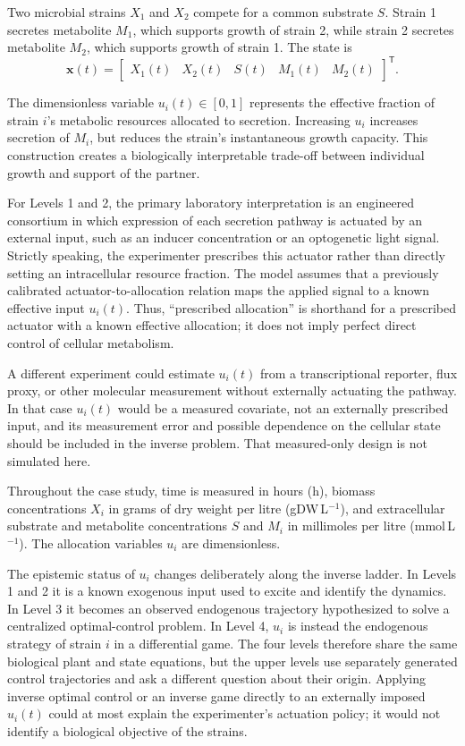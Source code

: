 \documentclass[11pt,a4paper]{article}
\newcommand{\vect}[1]{\boldsymbol{#1}}
\begin{document}
Two microbial strains \(X_1\) and \(X_2\) compete for a common substrate \(S\).
Strain 1 secretes metabolite \(M_1\), which supports growth of strain 2, while
strain 2 secretes metabolite \(M_2\), which supports growth of strain 1. The
state is
\begin{equation}
  \vect{x}(t)=
  \begin{bmatrix}
    X_1(t) & X_2(t) & S(t) & M_1(t) & M_2(t)
  \end{bmatrix}^{\mathsf T}.
\end{equation}

The dimensionless variable \(u_i(t)\in[0,1]\) represents the effective
fraction of strain \(i\)'s metabolic resources allocated to secretion.
Increasing \(u_i\) increases secretion of \(M_i\), but reduces the strain's
instantaneous growth capacity. This construction creates a biologically
interpretable trade-off between individual growth and support of the partner.

For Levels 1 and 2, the primary laboratory interpretation is an engineered
consortium in which expression of each secretion pathway is actuated by an
external input, such as an inducer concentration or an optogenetic light
signal. Strictly speaking, the experimenter prescribes this actuator rather
than directly setting an intracellular resource fraction. The model assumes
that a previously calibrated actuator-to-allocation relation maps the applied
signal to a known effective input \(u_i(t)\). Thus, ``prescribed allocation''
is shorthand for a prescribed actuator with a known effective allocation; it
does not imply perfect direct control of cellular metabolism.

A different experiment could estimate \(u_i(t)\) from a transcriptional
reporter, flux proxy, or other molecular measurement without externally
actuating the pathway. In that case \(u_i(t)\) would be a measured covariate,
not an externally prescribed input, and its measurement error and possible
dependence on the cellular state should be included in the inverse problem.
That measured-only design is not simulated here.

Throughout the case study, time is measured in hours (h), biomass
concentrations \(X_i\) in grams of dry weight per litre (gDW\,L\(^{-1}\)),
and extracellular substrate and metabolite concentrations \(S\) and \(M_i\)
in millimoles per litre (mmol\,L\(^{-1}\)). The allocation variables \(u_i\)
are dimensionless.

The epistemic status of \(u_i\) changes deliberately along the inverse
ladder. In Levels 1 and 2 it is a known exogenous input used to excite and
identify the dynamics. In Level 3 it becomes an observed endogenous
trajectory hypothesized to solve a centralized optimal-control problem. In
Level 4, \(u_i\) is instead the endogenous strategy of strain \(i\) in a
differential game. The four levels therefore share the same biological
plant and state equations, but the upper levels use separately generated
control trajectories and ask a different question about their origin.
Applying inverse optimal control or an inverse game directly to an externally
imposed \(u_i(t)\) could at most explain the experimenter's actuation policy;
it would not identify a biological objective of the strains.
\end{document}
